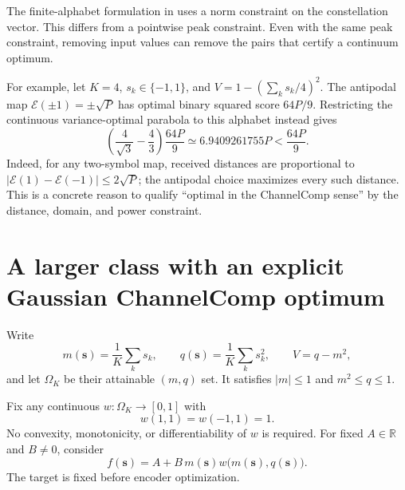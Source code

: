 \documentclass[11pt,letterpaper]{article}
\theoremstyle{remark}
\newcommand{\enc}{\mathscr E}
\newcommand{\R}{\mathbb R}
\begin{document}
The finite-alphabet formulation in \cite[Eq.~(10)]{noiseaware} uses a norm constraint on the constellation vector. This differs from a pointwise peak constraint. Even with the same peak constraint, removing input values can remove the pairs that certify a continuum optimum.

For example, let $K=4$, $s_k\in\{-1,1\}$, and $V=1-(\sum_k s_k/4)^2$. The antipodal map $\enc(\pm1)=\pm\sqrt P$ has optimal binary squared score $64P/9$. Restricting the continuous variance-optimal parabola to this alphabet instead gives
$$
 \left(\frac4{\sqrt3}-\frac43\right)\frac{64P}{9}
 \simeq6.9409261755P<\frac{64P}{9}.
$$
Indeed, for any two-symbol map, received distances are proportional to $|\enc(1)-\enc(-1)|\le2\sqrt P$; the antipodal choice maximizes every such distance. This is a concrete reason to qualify ``optimal in the ChannelComp sense'' by the distance, domain, and power constraint.

\section{A larger class with an explicit Gaussian ChannelComp optimum}
Write
$$
 m(\mathbf s)=\frac1K\sum_k s_k,\qquad
 q(\mathbf s)=\frac1K\sum_k s_k^2,\qquad V=q-m^2,
$$
and let $\Omega_K$ be their attainable $(m,q)$ set. It satisfies $|m|\le1$ and $m^2\le q\le1$.

Fix any continuous $w:\Omega_K\to[0,1]$ with
$$
 w(1,1)=w(-1,1)=1.
$$
No convexity, monotonicity, or differentiability of $w$ is required. For fixed $A\in\R$ and $B\ne0$, consider
\begin{equation}
 f(\mathbf s)=A+B\,m(\mathbf s)w\bigl(m(\mathbf s),q(\mathbf s)\bigr).
 \label{eq:gaussclass}
\end{equation}
The target is fixed before encoder optimization.
\end{document}
